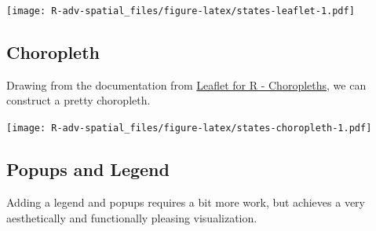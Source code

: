 \documentclass[]{book}
\newenvironment{Shaded}{\begin{snugshade}}{\end{snugshade}}
\newcommand{\KeywordTok}[1]{\textcolor[rgb]{0.13,0.29,0.53}{\textbf{{#1}}}}
\newcommand{\DataTypeTok}[1]{\textcolor[rgb]{0.13,0.29,0.53}{{#1}}}
\newcommand{\DecValTok}[1]{\textcolor[rgb]{0.00,0.00,0.81}{{#1}}}
\newcommand{\FloatTok}[1]{\textcolor[rgb]{0.00,0.00,0.81}{{#1}}}
\newcommand{\StringTok}[1]{\textcolor[rgb]{0.31,0.60,0.02}{{#1}}}
\newcommand{\CommentTok}[1]{\textcolor[rgb]{0.56,0.35,0.01}{\textit{{#1}}}}
\newcommand{\OtherTok}[1]{\textcolor[rgb]{0.56,0.35,0.01}{{#1}}}
\newcommand{\NormalTok}[1]{{#1}}
\theoremstyle{definition}
\theoremstyle{definition}
\theoremstyle{definition}
\theoremstyle{remark}
\begin{document}
\texttt{[image: R-adv-spatial\_files/figure-latex/states-leaflet-1.pdf]}

\subsection{Choropleth}\label{choropleth}

Drawing from the documentation from
\href{http://rstudio.github.io/leaflet/choropleths.html}{Leaflet for R -
Choropleths}, we can construct a pretty choropleth.

\begin{Shaded}
\end{Shaded}

\texttt{[image: R-adv-spatial\_files/figure-latex/states-choropleth-1.pdf]}

\subsection{Popups and Legend}\label{popups-and-legend}

Adding a legend and popups requires a bit more work, but achieves a very
aesthetically and functionally pleasing visualization.
\end{document}
